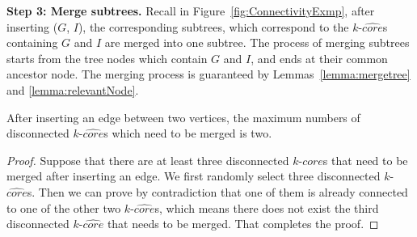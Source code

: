


\textbf{Step 3: Merge subtrees.}
Recall in Figure~\ref{fig:ConnectivityExmp}, after inserting ($G$, $I$), the corresponding subtrees, which correspond to the $k$-$\widehat{core}$s containing $G$ and $I$ are merged into one subtree. The process of merging subtrees starts from the tree nodes which contain $G$ and $I$, and ends at their common ancestor node.
The merging process is guaranteed by Lemmas~\ref{lemma:mergetree} and \ref{lemma:relevantNode}.

\begin{lemma}
\label{lemma:mergetree}
After inserting an edge between two vertices, the maximum numbers of disconnected $k$-$\widehat{core}$s
which need to be merged is two.
\end{lemma}
\begin{proof}
Suppose that there are at least three disconnected $k$-$\widehat{core}$s that need to be merged after inserting an edge.
We first randomly select three disconnected $k$-$\widehat{core}$s. Then we can prove by contradiction that one of them is already connected to one of the other two $k$-$\widehat{core}$s, which means there does not exist the third disconnected $k$-$\widehat{core}$ that needs to be merged. That completes the proof.
\end{proof}

